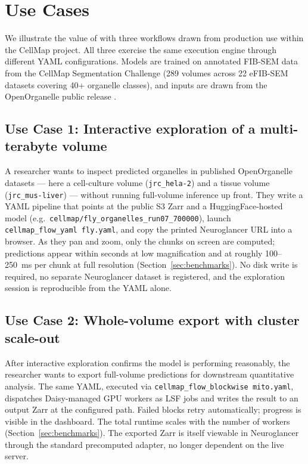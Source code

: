 \section{Use Cases}
\label{sec:usecases}

We illustrate the value of \cellmapflow{} with three workflows drawn from production use within the CellMap project. All three exercise the same execution engine through different YAML configurations. Models are trained on annotated FIB-SEM data from the CellMap Segmentation Challenge \cite{CellMapChallenge} (289 volumes across 22 eFIB-SEM datasets covering 40+ organelle classes), and inputs are drawn from the OpenOrganelle public release \cite{Xu2021,OpenOrganelle}.

\subsection*{Use Case 1: Interactive exploration of a multi-terabyte volume}

A researcher wants to inspect predicted organelles in published OpenOrganelle datasets \cite{Xu2021,OpenOrganelle} --- here a cell-culture volume (\texttt{jrc\_hela-2}) and a tissue volume (\texttt{jrc\_mus-liver}) --- without running full-volume inference up front. They write a YAML pipeline that points at the public S3 Zarr and a HuggingFace-hosted model (e.g.\ \texttt{cellmap/fly\_organelles\_run07\_700000}), launch \texttt{cellmap\_flow\_yaml fly.yaml}, and copy the printed Neuroglancer URL into a browser. As they pan and zoom, only the chunks on screen are computed; predictions appear within seconds at low magnification and at roughly 100--250~ms per chunk at full resolution (Section~\ref{sec:benchmarks}). No disk write is required, no separate Neuroglancer dataset is registered, and the exploration session is reproducible from the YAML alone. 

\subsection*{Use Case 2: Whole-volume export with cluster scale-out}

After interactive exploration confirms the model is performing reasonably, the researcher wants to export full-volume predictions for downstream quantitative analysis. The same YAML, executed via \texttt{cellmap\_flow\_blockwise mito.yaml}, dispatches Daisy-managed GPU workers as LSF jobs and writes the result to an output Zarr at the configured path. Failed blocks retry automatically; progress is visible in the dashboard. The total runtime scales with the number of workers (Section~\ref{sec:benchmarks}). The exported Zarr is itself viewable in Neuroglancer through the standard precomputed adapter, no longer dependent on the live \cellmapflow{} server.

